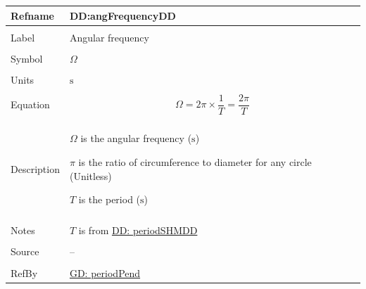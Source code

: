 \documentclass[12pt]{article}
\begin{document}
\vspace{\baselineskip}
\noindent
\begin{minipage}{\textwidth}
\begin{tabular}{>{\raggedright}p{}>{\raggedright\arraybackslash}p{}}
\toprule \textbf{Refname} & \textbf{DD:angFrequencyDD}
\label{DD:angFrequencyDD}
\\ \midrule \\
Label & Angular frequency
        
\\ \midrule \\
Symbol & $Ω$
         
\\ \midrule \\
Units & ${\text{s}}$
        
\\ \midrule \\
Equation & \begin{displaymath}
           Ω=2 π\times\frac{1}{T}=\frac{2 π}{T}
           \end{displaymath}
\\ \midrule \\
Description & \begin{symbDescription}
              \item{$Ω$ is the angular frequency (${\text{s}}$)}
              \item{$π$ is the ratio of circumference to diameter for any circle (Unitless)}
              \item{$T$ is the period (${\text{s}}$)}
              \end{symbDescription}
\\ \midrule \\
Notes & $T$ is from \hyperref[DD:periodSHMDD]{DD: periodSHMDD}
        
\\ \midrule \\
Source & --
         
\\ \midrule \\
RefBy & \hyperref[GD:periodPend]{GD: periodPend}
        
\\ \bottomrule
\end{tabular}
\end{minipage}
\end{document}
